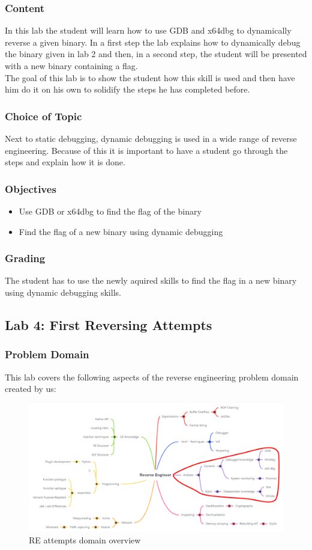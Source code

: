 \subsubsection*{Content}
In this lab the student will learn how to use GDB and x64dbg to dynamically reverse a given binary. In a first step the lab explains how to dynamically debug the binary given in lab 2 and then, in a second step, the student will be presented with a new binary containing a flag. \\
The goal of this lab is to show the student how this skill is used and then have him do it on his own to solidify the steps he has completed before.
\subsubsection*{Choice of Topic}
Next to static debugging, dynamic debugging is used in a wide range of reverse engineering. Because of this it is important to have a student go through the steps and explain how it is done. 
\subsubsection*{Objectives}
\begin{itemize}
    \item Use GDB or x64dbg to find the flag of the binary
    \item Find the flag of a new binary using dynamic debugging
\end{itemize}
\subsubsection*{Grading}
The student has to use the newly aquired skills to find the flag in a new binary using dynamic debugging skills.
\pagebreak

\subsection{Lab 4: First Reversing Attempts}
\subsubsection*{Problem Domain}
This lab covers the following aspects of the reverse engineering problem domain created by us:
\vspace{-2ex}
\begin{figure}[H]
    \includegraphics[width=\textwidth]{resources/reattempts-overview-light.png}
    \caption{RE attempts domain overview}
    \label{fig:reattempts-overview}
\end{figure}
